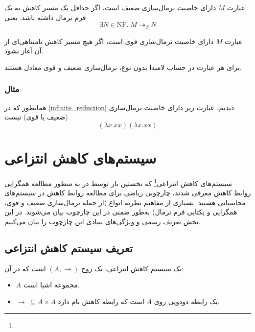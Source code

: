 \begin{defn}
عبارت
$M$
دارای خاصیت نرمال‌سازی ضعیف است، اگر حداقل یک مسیر کاهش به یک فرم نرمال داشته باشد.
یعنی
\begin{equation*}
\exists N\in \mathrm{NF}.\;M \twoheadrightarrow_{\beta} N
\end{equation*}
\end{defn}

\begin{defn}
عبارت
$M$
دارای خاصیت نرمال‌سازی قوی است، اگر هیچ مسیر کاهش نامتناهی‌ای از آن آغاز نشود.
\end{defn}

\begin{thm}
برای هر عبارت در حساب لامبدا بدون نوع، نرمال‌سازی ضعیف و قوی معادل‌ هستند.
\end{thm}

\subsubsection{مثال}
همانطور که در
\ref{infinite_reduction}
دیدیم، عبارت زیر دارای خاصیت نرمال‌سازی
(ضعیف یا قوی)
نیست
\begin{equation*}
(\lambda x.xx)(\lambda x.xx)
\end{equation*}

\section{سیستم‌های کاهش انتزاعی}

سیستم‌های کاهش انتزاعی\footnote{}
که نخستین بار توسط
در
\cite{newman1942}
به منظور مطالعه همگرایی روابط کاهش معرفی شدند، چارچوبی ریاضی برای مطالعه روابط کاهش در سیستم‌های محاسباتی هستند.
بسیاری از مفاهیم نظریه انواع
(از جمله نرمال‌سازی ضعیف و قوی، همگرایی و یکتایی فرم نرمال)
به‌طور ضمنی در این چارچوب بیان می‌شوند.
در این بخش تعریف رسمی و ویژگی‌های بنیادی این چارچوب را بیان می‌کنیم.

\subsection*{تعریف سیستم کاهش انتزاعی}

\begin{defn}
یک سیستم کاهش انتزاعی، یک زوج
$(A,\rightarrow)$
است که در آن:
\begin{itemize}
\item 
$A$
مجموعه‌ اشیا است.
\item
$\rightarrow \; \subseteq A \times A$
یک رابطه دودویی روی
$A$
است که رابطه کاهش نام دارد.
\end{itemize}
\end{defn}

